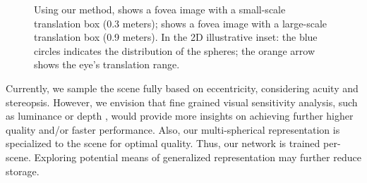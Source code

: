 \begin{figure}[!ht]
    \centering
    \hspace{1em} %
    {%
    Using our method,  shows a fovea image  with a small-scale translation box (0.3 meters);  shows a fovea image with a large-scale translation box (0.9 meters). In the 2D illustrative inset: the blue circles indicates the distribution of the spheres; the orange arrow shows the eye's translation range.
    }
    \label{fig:large_translation}
\end{figure}

Currently, we sample the scene fully based on eccentricity, considering acuity and stereopsis. However, we envision that fine grained visual sensitivity analysis, such as luminance \cite{Tursun:2019:LCA} or depth \cite{Sun:20:OE}, would provide more insights on achieving further higher quality and/or faster performance. Also, our multi-spherical representation is specialized to the scene for optimal quality. Thus, our network is trained per-scene. Exploring potential means of generalized representation may further reduce storage.

